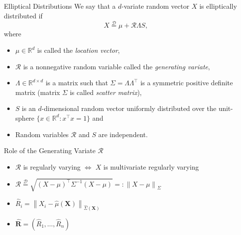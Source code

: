 \documentclass[11pt, aspectratio=169]{beamer}
\begin{document}
\begin{frame}{Elliptical Distributions \parencite{cambanis1981}} We say that a
  $d$-variate random vector $X$ is elliptically distributed if
  \begin{equation*}
    X \stackrel{\mathcal{D}}{=} \mu + \mathcal{R} \Lambda  S,
  \end{equation*}
  where
  \begin{itemize}
    \item $\mu\in\mathbb{R}^d$ is called the \emph{location vector},
    \item $\mathcal{R}$ is a nonnegative random variable called the
    \emph{generating variate},
    \item $\Lambda \in \mathbb{R}^{d\times d}$ is a matrix such that $\Sigma =
    \Lambda \Lambda^\intercal$ is a symmetric positive definite matrix (matrix
    $\Sigma$ is called \emph{scatter matrix}),
    \item $S$ is an $d$-dimensional random vector uniformly distributed over the
    unit-sphere $\{x\in\mathbb{R}^d: x^\intercal x = 1\}$ and
    \item Random variables $\mathcal{R}$ and $S$ are independent.
  \end{itemize}
\end{frame}


\begin{frame}{Role of the Generating Variate $\mathcal{R}$}
  \begin{itemize}
    \item $\mathcal{R}$ is regularly varying $\iff$ $X$ is multivariate
    regularly varying \parencite{hult2002}
    \pause
    \item $\mathcal{R} \stackrel{\mathcal{D}}{=} \sqrt{\left(X -
    \mu\right)^\intercal \Sigma^{-1}\left(X - \mu\right)} =: \left\|X -
    \mu\right\|_{\Sigma}$
    \pause
    \item $\hat R_i = \left\|X_i - \hat\mu\left(\bm X\right)\right\|
    _{\hat\Sigma\left(\bm X\right)}$
    \item $\hat{\bm R} = (\hat R_1, \ldots, \hat R_n)$
  \end{itemize}
\end{frame}

\end{document}
